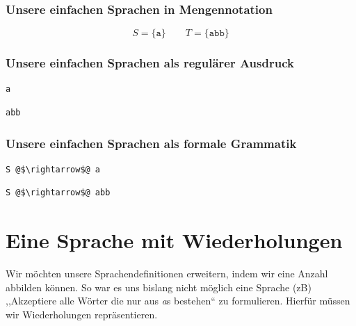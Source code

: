 \subsubsection*{Unsere einfachen Sprachen in Mengennotation}
\[
  S = \{\texttt{a}\}  \qquad  T = \{\texttt{abb}\}
\]

\subsubsection*{Unsere einfachen Sprachen als regulärer Ausdruck}
\begin{lstlisting}
a
\end{lstlisting}
\begin{lstlisting}
abb
\end{lstlisting}

\subsubsection*{Unsere einfachen Sprachen als formale Grammatik}
\begin{lstlisting}
S @$\rightarrow$@ a
\end{lstlisting}
\begin{lstlisting}
S @$\rightarrow$@ abb
\end{lstlisting}

\section{Eine Sprache mit Wiederholungen}
%
Wir möchten unsere Sprachendefinitionen erweitern, indem wir eine Anzahl abbilden können. So war es uns bislang nicht möglich eine Sprache (zB) ,,Akzeptiere alle Wörter die nur aus \emph{a}s bestehen`` zu formulieren. Hierfür müssen wir Wiederholungen repräsentieren.

